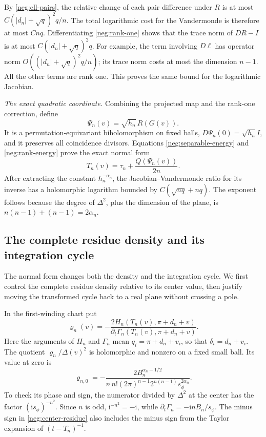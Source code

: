 \documentclass[11pt]{article}
\numberwithin{equation}{section}
\theoremstyle{definition}
\newcommand{\ii}{\mathrm i}
\begin{document}
By \eqref{neg:ell-pairs}, the relative change of each pair
difference under \(R\) is at most
\(C(|d_n|+\sqrt q)^2q/n\).
The total logarithmic cost for the Vandermonde is therefore
at most \(Cnq\).  Differentiating \eqref{neg:rank-one}
shows that the trace norm of \(DR-I\) is at most
\(C(|d_n|+\sqrt q)^2q\).  For example, the term involving
\(D\ell\) has operator norm \(O((|d_n|+\sqrt q)^2q/n)\);
its trace norm costs at most the dimension \(n-1\).
All the other terms are rank one.  This proves the same
bound for the logarithmic Jacobian.

\emph{The exact quadratic coordinate.} Combining the projected
map and the rank-one correction, define
\begin{equation}
 \Psi_n(v)=\sqrt{h_n}\,R(G(v)).
 \label{neg:Psi}
\end{equation}
It is a permutation-equivariant biholomorphism on fixed
balls, \(D\Psi_n(0)=\sqrt{h_n}I\), and it preserves all
coincidence divisors.  Equations
\eqref{neg:separable-energy} and \eqref{neg:rank-energy}
prove the exact normal form
\begin{equation}
 T_n(v)=\tau_n+\frac{Q(\Psi_n(v))}{2n}.
 \label{neg:exact-quadratic}
\end{equation}
After extracting the constant \(h_n^{-\alpha_n}\), the
Jacobian--Vandermonde ratio for its inverse has a
holomorphic logarithm bounded by
\(C(\sqrt{nq}+nq)\).  The exponent follows because the
degree of \(\Delta^2\), plus the dimension of the plane,
is \(n(n-1)+(n-1)=2\alpha_n\).

\subsection{The complete residue density and its integration cycle}
\label{neg:density-cycle}

The normal form changes both the density and the integration cycle.
We first control the complete residue density relative to its center
value, then justify moving the transformed cycle back to a real
plane without crossing a pole.

In the first-winding chart put
\[
 \varrho_n(v)=
 -\frac{2H_n(T_n(v),\pi+d_n+v)}
        {\partial_t\Gamma_n(T_n(v),\pi+d_n+v)} .
 \]
Here the arguments of \(H_n\) and \(\Gamma_n\) mean
\(q_i=\pi+d_n+v_i\), so that \(\delta_i=d_n+v_i\).
The quotient
\(\varrho_n/\Delta(v)^2\) is holomorphic and nonzero on a
fixed small ball.  Its value at zero is
\begin{equation}
 \varrho_{n,0}=
 -\frac{2B_n^{\alpha_n-1/2}}
 {n\,n!(2\pi)^{n-1}2^{n(n-1)}s_\phi^{2\alpha_n}} .
 \label{neg:center-residue}
\end{equation}
To check its phase and sign, the numerator divided by
\(\Delta^2\) at the center has the factor
\((\ii s_\phi)^{-n^2}\).
Since \(n\) is odd, \(\ii^{-n^2}=-\ii\), while
\(\partial_t\Gamma_n=-\ii nB_n/s_\phi\).
The minus sign in \eqref{neg:center-residue} also includes
the minus sign from the Taylor expansion of \((t-T_n)^{-1}\).
\end{document}

